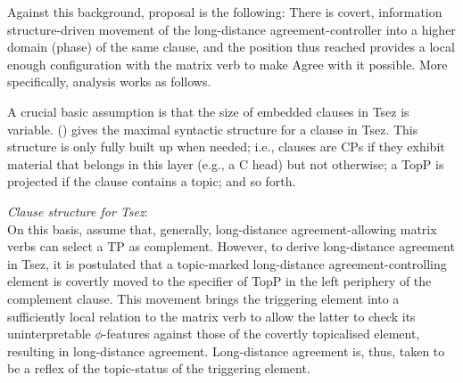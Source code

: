 \documentclass[output=paper
,modfonts
,nonflat]{langsci/langscibook}
\begin{document}
Against this background,  proposal is
the following: There is  covert, information structure-driven
  movement of the long-distance agreement-controller into a higher domain (phase) of the
  same clause, and the position thus reached provides a  local enough
  configuration with the matrix verb to make  Agree with it possible.
More specifically,  analysis works as
follows. 

A crucial basic assumption is that the size of embedded clauses in
Tsez is variable. (\Next) gives the maximal syntactic structure for a
clause in Tsez. This structure is only fully  built up when needed;
i.e., clauses are CPs if they exhibit material that belongs in this
layer (e.g., a C head) but not otherwise; a TopP is projected if the
clause contains a topic; and so forth. 

\ea\label{ex:mueller:10} {\itshape Clause \label{Tsezstructure}structure for Tsez}:\\
\z
On this  basis,  \cite{Polinsky&Potsdam:01} assume that, generally, long-distance agreement-allowing matrix
  verbs can select a TP as complement. 
However,  to derive long-distance agreement in Tsez, it is postulated
that a   topic-marked long-distance agreement-controlling element is covertly moved to the
  specifier of TopP in the left periphery of the complement clause. 
 This movement brings the triggering element into a sufficiently
  local relation to the matrix verb to allow the latter to check its
  uninterpretable $\phi$-features against those of the covertly
  topicalised element, resulting in long-distance agreement.
 Long-distance agreement is, thus, taken to be a reflex of the topic-status of the
  triggering element. 
\end{document}
